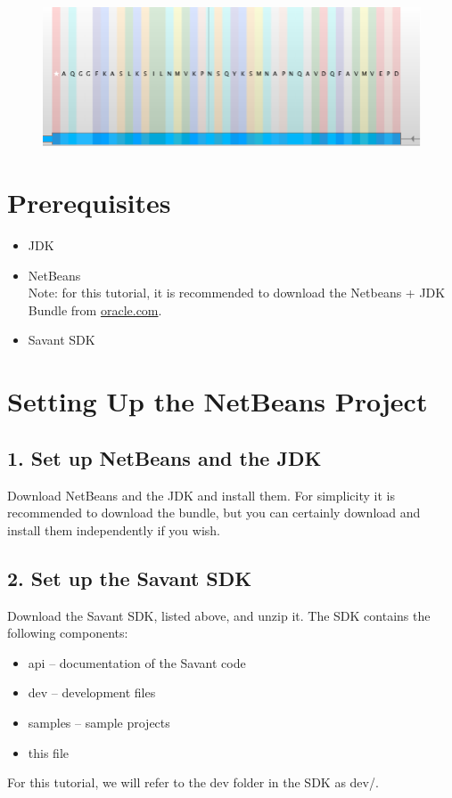 \documentclass[times,11pt]{report}
\begin{document}
\begin{figure}[h]
\begin{center}
\includegraphics[type=png,ext=.png,read=.png,width=15cm]{images/AminoPlugin}
\end{center}
\end{figure}

\section{Prerequisites}
\begin{itemize}
	\item JDK
	\item NetBeans\\
		Note: for this tutorial, it is recommended to download the Netbeans + JDK Bundle from \href{http://www.oracle.com/technetwork/java/javase/downloads}{oracle.com}.
	\item Savant SDK
\end{itemize}

\section{Setting Up the NetBeans Project}
\subsection*{1. Set up NetBeans and the JDK}
Download NetBeans and the JDK and install them. For simplicity it is recommended to download the bundle, but you can certainly download and install them independently if you wish.
\subsection*{2. Set up the Savant SDK}
Download the Savant SDK, listed above, and unzip it. The SDK contains the following components:
\begin{itemize}
	\item api -- documentation of the Savant code
	\item dev -- development files
	\item samples -- sample projects
	\item this file
\end{itemize}
For this tutorial, we will refer to the dev folder in the SDK as dev/.
\end{document}
